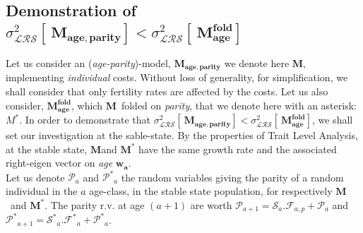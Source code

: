 \documentclass[10pt,a4paper]{article}
\newcommand{\M}{$\mathbf{M}$}
\newcommand{\PCoR}{\emph{individual} costs}
\newcommand{\TLA}{Trait Level Analysis}
\begin{document}

\subsection{Demonstration of \texorpdfstring{$\sigma^{2}_{\mathcal{LRS}}\left[\ \mathbf{M_{age,parity}} \right]<\sigma^{2}_{\mathcal{LRS}}\left[\ \mathbf{M^{fold}_{age}} \right]$}{a}}%
\label{blalalalalala}

Let us consider an (\emph{age-parity})-model, $\mathbf{M_{age,parity}}$ we denote here $\mathbf{M}$, implementing \PCoR. Without loss of generality, for simplification, we shall consider that only fertility rates are affected by the costs. Let us also consider, $\mathbf{M^{fold}_{age}}$, which \M\ folded on \emph{parity}, that we denote here with an asterisk: $M^{*}$. In order to demonstrate that $\sigma^{2}_{\mathcal{LRS}}\left[\ \mathbf{M_{age,parity}} \right]<\sigma^{2}_{\mathcal{LRS}}\left[\ \mathbf{M^{fold}_{age}} \right]$, we shall set our investigation at the sable-state. By the properties of \TLA, at the stable state, \M and $\mathbf{M^{*}}$ have the same growth rate and the associated right-eigen vector on \emph{age} $\bm{w_{a}}$. \\

Let us denote $\mathcal{P}_a$ and $\mathcal{P^{*}}_a$ the random variables giving the parity of a random individual in the $a$ age-class, in the stable state population, for respectively \M\ and $\mathbf{M^{*}}$. 
The parity r.v. at age $(a+1)$ are worth $\mathcal{P}_{a+1} = \mathcal{S}_{a}.\mathcal{F}_{a,p} + \mathcal{P}_a$  and $\mathcal{P^{*}}_{a+1} = \mathcal{S^{*}}_{a}.\mathcal{F^{*}}_{a} + \mathcal{P^{*}}_a$. \\
\end{document}
